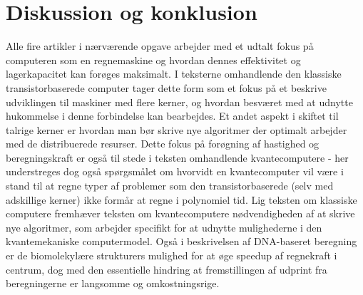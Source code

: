 \documentclass[10pt,a4paper]{article}
\begin{document}
\section{Diskussion og konklusion}
Alle fire artikler i nærværende opgave arbejder med et udtalt fokus på
computeren som en regnemaskine og hvordan dennes effektivitet og lagerkapacitet kan 
forøges maksimalt. I teksterne omhandlende den klassiske transistorbaserede
computer tager dette form som et fokus på et beskrive udviklingen til maskiner
med flere kerner, og hvordan besværet med at udnytte hukommelse i denne forbindelse
kan bearbejdes. Et andet aspekt i skiftet til talrige kerner er hvordan man bør
skrive nye algoritmer der optimalt arbejder med de distribuerede resurser. 
Dette fokus på forøgning af hastighed og beregningskraft er også til stede i
teksten omhandlende kvantecomputere - her understreges dog også spørgsmålet om 
hvorvidt en kvantecomputer vil være i stand til at regne typer af problemer som 
den transistorbaserede (selv med adskillige kerner) ikke formår at regne i 
polynomiel tid. Lig teksten om klassiske computere fremhæver teksten om 
kvantecomputere nødvendigheden af at skrive nye algoritmer, som arbejder 
specifikt for at udnytte mulighederne i den kvantemekaniske computermodel. 
Også i beskrivelsen af DNA-baseret beregning er de biomolekylære strukturers
mulighed for at øge speedup af regnekraft i centrum, dog med den essentielle
hindring at fremstillingen af udprint fra beregningerne er langsomme og 
omkostningsrige. 
\end{document}
